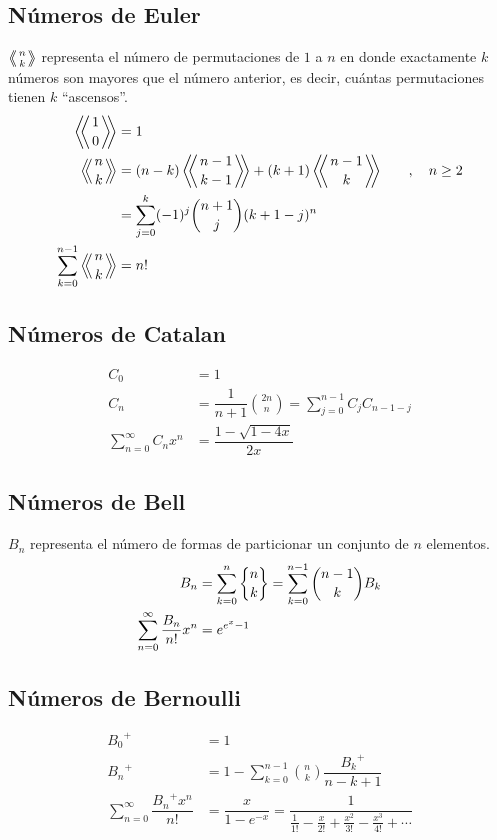 	\subsection{Números de Euler}
		$\left\langle\!\!\left\langle {n \atop k} \right\rangle\!\!\right\rangle$ representa el número de permutaciones de $1$ a $n$ en donde exactamente $k$ números son mayores que el número anterior, es decir, cuántas permutaciones tienen $k$ ``ascensos''.
		\begin{align*}
			\euler{1}{0} &= 1 \\
			\euler{n}{k} &= (n-k)\euler{n-1}{k-1} + (k+1)\euler{n-1}{k} \quad &, \quad n \geq 2 \\
			&= \sum_{j=0}^{k} (-1)^j \binom{n+1}{j} (k+1-j)^n \\
			\sum_{k=0}^{n-1} \euler{n}{k} &= n!
		\end{align*}
	
	\subsection{Números de Catalan}
		\begin{align*}
			C_0 &= 1 \\
			C_n &= \dfrac{1}{n+1}\binom{2n}{n} = \sum_{j=0}^{n-1} C_j C_{n-1-j} \\
			\sum_{n=0}^{\infty} C_n x^n &= \dfrac{1-\sqrt{1-4x}}{2x}
		\end{align*}
	
	\subsection{Números de Bell}
		$B_n$ representa el número de formas de particionar un conjunto de $n$ elementos.
		\begin{align*}
			B_n &= \sum_{k=0}^{n}\stirlingII{n}{k} = \sum_{k=0}^{n-1}\binom{n-1}{k} B_k \\
			\sum_{n=0}^{\infty} \dfrac{B_n}{n!}x^n &= e^{e^x-1}
		\end{align*}
	
	\subsection{Números de Bernoulli}
		\begin{align*}
			{B_0}^+ &= 1 \\
			{B_n}^+ &= 1 - \sum_{k=0}^{n-1}\binom{n}{k}\dfrac{{B_k}^+}{n-k+1} \\
			\sum_{n=0}^{\infty} \dfrac{{B_n}^+ x^n}{n!} &= \dfrac{x}{1-e^{-x}} = \dfrac{1}{\frac{1}{1!}-\frac{x}{2!}+\frac{x^2}{3!}-\frac{x^3}{4!}+\cdots}
		\end{align*}
	
